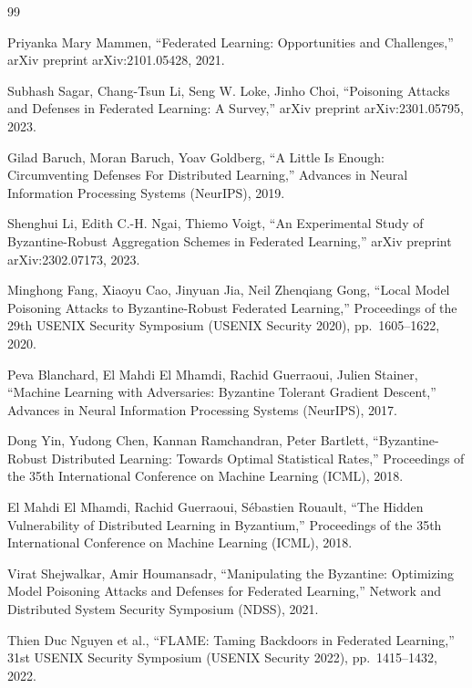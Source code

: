 \documentclass[a4paper,10pt]{article}
\begin{document}
{\small
\begin{thebibliography}{99}

Priyanka Mary Mammen,
``Federated Learning: Opportunities and Challenges,''
arXiv preprint arXiv:2101.05428, 2021.

Subhash Sagar, Chang-Tsun Li, Seng W. Loke, Jinho Choi,
``Poisoning Attacks and Defenses in Federated Learning: A Survey,''
arXiv preprint arXiv:2301.05795, 2023.

Gilad Baruch, Moran Baruch, Yoav Goldberg,
``A Little Is Enough: Circumventing Defenses For Distributed Learning,''
Advances in Neural Information Processing Systems (NeurIPS), 2019.

Shenghui Li, Edith C.-H. Ngai, Thiemo Voigt,
``An Experimental Study of Byzantine-Robust Aggregation Schemes in Federated Learning,''
arXiv preprint arXiv:2302.07173, 2023.

Minghong Fang, Xiaoyu Cao, Jinyuan Jia, Neil Zhenqiang Gong,
``Local Model Poisoning Attacks to Byzantine-Robust Federated Learning,''
Proceedings of the 29th USENIX Security Symposium (USENIX Security 2020),
pp.~1605--1622, 2020.

Peva Blanchard, El Mahdi El Mhamdi, Rachid Guerraoui, Julien Stainer,
``Machine Learning with Adversaries: Byzantine Tolerant Gradient Descent,''
Advances in Neural Information Processing Systems (NeurIPS), 2017.

Dong Yin, Yudong Chen, Kannan Ramchandran, Peter Bartlett,
``Byzantine-Robust Distributed Learning: Towards Optimal Statistical Rates,''
Proceedings of the 35th International Conference on Machine Learning (ICML), 2018.

El Mahdi El Mhamdi, Rachid Guerraoui, S\'ebastien Rouault,
``The Hidden Vulnerability of Distributed Learning in Byzantium,''
Proceedings of the 35th International Conference on Machine Learning (ICML), 2018.

Virat Shejwalkar, Amir Houmansadr,
``Manipulating the Byzantine: Optimizing Model Poisoning Attacks and Defenses for Federated Learning,''
Network and Distributed System Security Symposium (NDSS), 2021.

Thien Duc Nguyen et al.,
``FLAME: Taming Backdoors in Federated Learning,''
31st USENIX Security Symposium (USENIX Security 2022), pp.~1415--1432, 2022.


\end{thebibliography}}
\end{document}
